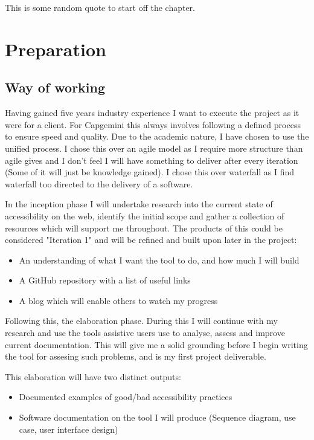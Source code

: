 \begin{savequote}[75mm]
This is some random quote to start off the chapter.
\end{savequote}

\chapter{Preparation}

\section{Way of working}
Having gained five years industry experience I want to execute the project as it were for a client. For Capgemini this always involves
following a defined process to ensure speed and quality. Due to the academic nature, I have chosen to use the unified process. I chose this
over an agile model as I require more structure than agile gives and I don't feel I will have something to deliver after every iteration
(Some of it will just be knowledge gained). I chose this over waterfall as I find waterfall too directed to the delivery of a software.


In the inception phase I will undertake research into the current state of accessibility on the web, identify the initial scope and gather
a collection of resources which will support me throughout. The products of
this could be considered "Iteration 1" and will be refined and built upon
later in the project:
\begin{itemize}
  \item An understanding of what I want the tool to do, and how much I will build
  \item A GitHub repository with a list of useful links
  \item A blog which will enable others to watch my progress
\end{itemize}

Following this, the elaboration phase. During this I will continue with my research and use the tools assistive users use to analyse,
assess and improve current documentation. This will give me a solid grounding before I begin writing the tool for assesing such problems,
 and is my first project deliverable.

This elaboration will have two distinct outputs:
\begin{itemize}
  \item Documented examples of good/bad accessibility practices
  \item Software documentation on the tool I will produce (Sequence diagram, use case, user interface design)
\end{itemize}

